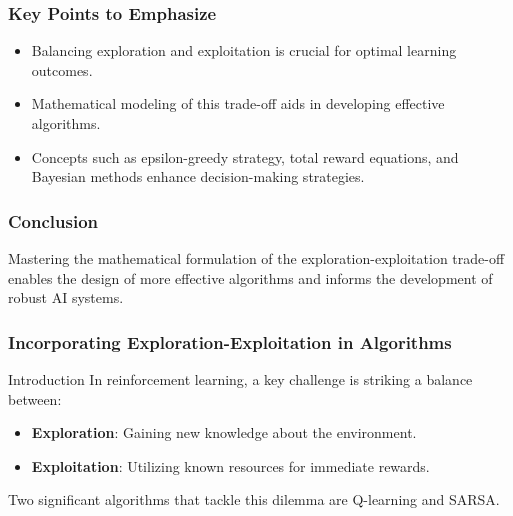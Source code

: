 \documentclass[aspectratio=169]{beamer}
\begin{document}
\begin{frame}[fragile]
    \frametitle{Key Points to Emphasize}
    \begin{itemize}
        \item Balancing exploration and exploitation is crucial for optimal learning outcomes.
        \item Mathematical modeling of this trade-off aids in developing effective algorithms.
        \item Concepts such as epsilon-greedy strategy, total reward equations, and Bayesian methods enhance decision-making strategies.
    \end{itemize}
\end{frame}

\begin{frame}[fragile]
    \frametitle{Conclusion}
    Mastering the mathematical formulation of the exploration-exploitation trade-off enables the design of more effective algorithms and informs the development of robust AI systems.
\end{frame}

\begin{frame}[fragile]
    \frametitle{Incorporating Exploration-Exploitation in Algorithms}
    \begin{block}{Introduction}
        In reinforcement learning, a key challenge is striking a balance between:
        \begin{itemize}
            \item \textbf{Exploration}: Gaining new knowledge about the environment.
            \item \textbf{Exploitation}: Utilizing known resources for immediate rewards.
        \end{itemize}
        Two significant algorithms that tackle this dilemma are Q-learning and SARSA.
    \end{block}
\end{frame}
\end{document}
